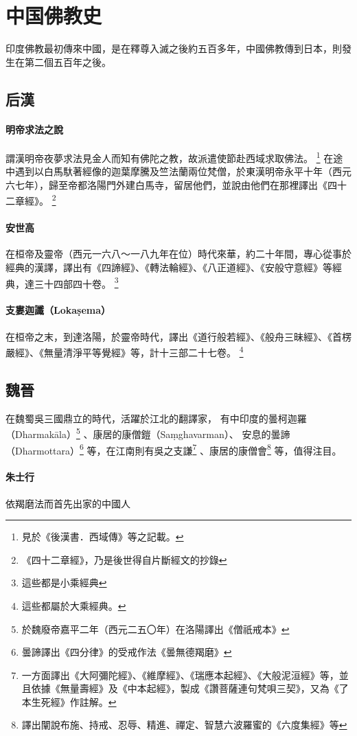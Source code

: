 \section{中国佛教史}
印度佛教最初傳來中國，是在釋尊入滅之後約五百多年，中國佛教傳到日本，則發生在第二個五百年之後。


\subsection{后漢}
\paragraph{明帝求法之說}
謂漢明帝夜夢求法見金人而知有佛陀之教，故派遣使節赴西域求取佛法。
\footnote{見於《後漢書．西域傳》等之記載。}
在途中遇到以白馬馱著經像的迦葉摩騰及竺法蘭兩位梵僧，於東漢明帝永平十年（西元六七年），歸至帝都洛陽門外建白馬寺，留居他們，並說由他們在那裡譯出《四十二章經》。
\footnote{《四十二章經》，乃是後世得自片斷經文的抄錄}
\paragraph{安世高}
在桓帝及靈帝（西元一六八～一八九年在位）時代來華，約二十年間，專心從事於經典的漢譯，譯出有《四諦經》、《轉法輪經》、《八正道經》、《安般守意經》等經典，達三十四部四十卷。
\footnote{這些都是小乘經典}
\paragraph{支婁迦讖（Lokaṣema）}
在桓帝之末，到達洛陽，於靈帝時代，譯出《道行般若經》、《般舟三昧經》、《首楞嚴經》、《無量清淨平等覺經》等，計十三部二十七卷。
\footnote{這些都屬於大乘經典。}

\subsection{魏晉}
在魏蜀吳三國鼎立的時代，活躍於江北的翻譯家，
有中印度的曇柯迦羅（Dharmakāla）\footnote{於魏廢帝嘉平二年（西元二五〇年）在洛陽譯出《僧祇戒本》}
、康居的康僧鎧（Saṃghavarman）、
安息的曇諦（Dharmottara）\footnote{曇諦譯出《四分律》的受戒作法《曇無德羯磨》}
等，在江南則有吳之支謙\footnote{一方面譯出《大阿彌陀經》、《維摩經》、《瑞應本起經》、《大般泥洹經》等，並且依據《無量壽經》及《中本起經》，製成《讚菩薩連句梵唄三契》，又為《了本生死經》作註解。}
、康居的康僧會\footnote{譯出闡說布施、持戒、忍辱、精進、禪定、智慧六波羅蜜的《六度集經》等}
等，值得注目。

\paragraph{朱士行} 依羯磨法而首先出家的中國人

